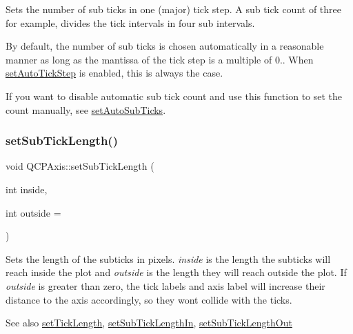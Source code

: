 Sets the number of sub ticks in one (major) tick step. A sub tick count of three for example, divides the tick intervals in four sub intervals.

By default, the number of sub ticks is chosen automatically in a reasonable manner as long as the mantissa of the tick step is a multiple of 0.. When \mbox{\hyperlink{class_q_c_p_axis_a99fe77b034e06f5b723995beab96e741}{set\+Auto\+Tick\+Step}} is enabled, this is always the case.

If you want to disable automatic sub tick count and use this function to set the count manually, see \mbox{\hyperlink{class_q_c_p_axis_adcbdec7a60054b88571e89599f4a45bf}{set\+Auto\+Sub\+Ticks}}. \mbox{\label{class_q_c_p_axis_ab702d6fd42fc620607435339a1c2a2e1}} 
\subsubsection{\texorpdfstring{set\+Sub\+Tick\+Length()}{setSubTickLength()}}
{\footnotesize\ttfamily void Q\+C\+P\+Axis\+::set\+Sub\+Tick\+Length (\begin{DoxyParamCaption}\item[{int}]{inside,  }\item[{int}]{outside = {} }\end{DoxyParamCaption})}

Sets the length of the subticks in pixels. {\itshape inside} is the length the subticks will reach inside the plot and {\itshape outside} is the length they will reach outside the plot. If {\itshape outside} is greater than zero, the tick labels and axis label will increase their distance to the axis accordingly, so they won\textquotesingle{}t collide with the ticks.

\begin{DoxySeeAlso}{See also}
\mbox{\hyperlink{class_q_c_p_axis_a62ec40bebe3540e9c1479a8fd2be3b0d}{set\+Tick\+Length}}, \mbox{\hyperlink{class_q_c_p_axis_ac46fa2a993a9f5789540977610acf1de}{set\+Sub\+Tick\+Length\+In}}, \mbox{\hyperlink{class_q_c_p_axis_a4c6dfc3963492ed72a77724012df5f23}{set\+Sub\+Tick\+Length\+Out}} 
\end{DoxySeeAlso}
\mbox{\label{class_q_c_p_axis_ac46fa2a993a9f5789540977610acf1de}} 
